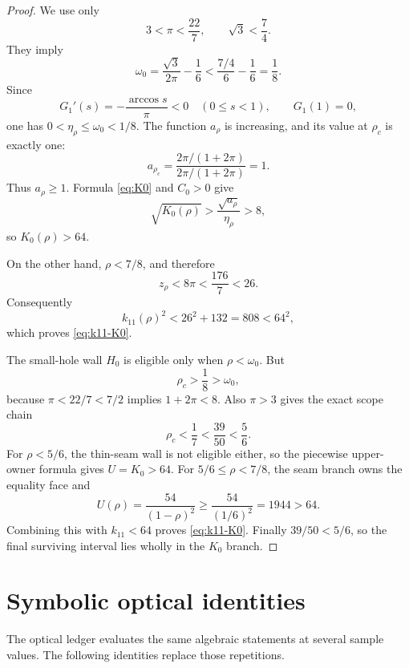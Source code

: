 \documentclass[11pt]{article}
\begin{document}
\begin{proof}
We use only
\[
       3<\pi<\frac{22}{7},
       \qquad \sqrt3<\frac74.
\]
They imply
\[
 \omega_0
 =\frac{\sqrt3}{2\pi}-\frac16
 <\frac{7/4}{6}-\frac16=\frac18.
\]
Since
\[
  G_1'(s)=-\frac{\arccos s}{\pi}<0\quad(0\leq s<1),
  \qquad G_1(1)=0,
\]
one has \(0<\eta_\rho\leq\omega_0<1/8\). The function
\(a_\rho\) is increasing, and its value at \(\rho_c\) is exactly one:
\[
 a_{\rho_c}
 =\frac{2\pi/(1+2\pi)}{2\pi/(1+2\pi)}=1.
\]
Thus \(a_\rho\geq1\). Formula \eqref{eq:K0} and \(C_0>0\) give
\[
 \sqrt{K_0(\rho)}
 >\frac{\sqrt{a_\rho}}{\eta_\rho}>8,
\]
so \(K_0(\rho)>64\).

 On the other hand, \(\rho<7/8\), and therefore
\[
 z_\rho<8\pi<\frac{176}{7}<26.
\]
Consequently
\[
 k_{11}(\rho)^2<26^2+132=808<64^2,
\]
which proves \eqref{eq:k11-K0}.

 The small-hole wall \(H_0\) is eligible only when
\(\rho<\omega_0\). But
\[
 \rho_c>\frac18>\omega_0,
\]
 because \(\pi<22/7<7/2\) implies \(1+2\pi<8\).
 Also \(\pi>3\) gives the exact scope chain
 \[
   \rho_c<\frac17<\frac{39}{50}<\frac56.
 \]
 For \(\rho<5/6\), the thin-seam wall is not eligible either, so the
 piecewise upper-owner formula gives \(U=K_0>64\). For
 \(5/6\leq\rho<7/8\), the seam branch owns the equality face and
 \[
  U(\rho)=\frac{54}{(1-\rho)^2}
  \geq \frac{54}{(1/6)^2}=1944>64.
 \]
 Combining this with \(k_{11}<64\) proves \eqref{eq:k11-K0}.
 Finally \(39/50<5/6\), so the final surviving interval lies wholly in
 the \(K_0\) branch.
\end{proof}

\section{Symbolic optical identities}

The optical ledger evaluates the same algebraic statements at several
sample values. The following identities replace those repetitions.
\end{document}
